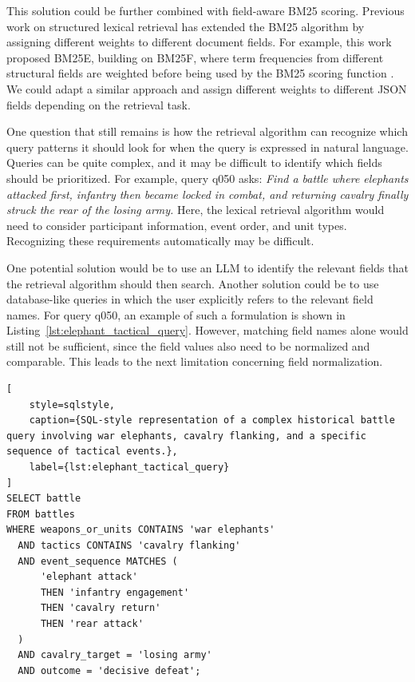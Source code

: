This solution could be further combined with field-aware BM25 scoring. Previous work on structured lexical retrieval has extended the BM25 algorithm by assigning different weights to different document fields. For example, this work proposed BM25E, building on BM25F, where term frequencies from different structural fields are weighted before being used by the BM25 scoring function \citep{lu2006fieldweighted}. We could adapt a similar approach and assign different weights to different JSON fields depending on the retrieval task.

One question that still remains is how the retrieval algorithm can recognize which query patterns it should look for when the query is expressed in natural language. Queries can be quite complex, and it may be difficult to identify which fields should be prioritized. For example, query q050 asks: \textit{Find a battle where elephants attacked first, infantry then became locked in combat, and returning cavalry finally struck the rear of the losing army.} Here, the lexical retrieval algorithm would need to consider participant information, event order, and unit types. Recognizing these requirements automatically may be difficult.

One potential solution would be to use an LLM to identify the relevant fields that the retrieval algorithm should then search. Another solution could be to use database-like queries in which the user explicitly refers to the relevant field names. For query q050, an example of such a formulation is shown in Listing~\ref{lst:elephant_tactical_query}. However, matching field names alone would still not be sufficient, since the field values also need to be normalized and comparable. This leads to the next limitation concerning field normalization.

\begin{minipage}{\textwidth}
\begin{lstlisting}[
    style=sqlstyle,
    caption={SQL-style representation of a complex historical battle query involving war elephants, cavalry flanking, and a specific sequence of tactical events.},
    label={lst:elephant_tactical_query}
]
SELECT battle
FROM battles
WHERE weapons_or_units CONTAINS 'war elephants'
  AND tactics CONTAINS 'cavalry flanking'
  AND event_sequence MATCHES (
      'elephant attack'
      THEN 'infantry engagement'
      THEN 'cavalry return'
      THEN 'rear attack'
  )
  AND cavalry_target = 'losing army'
  AND outcome = 'decisive defeat';
\end{lstlisting}
\end{minipage}

